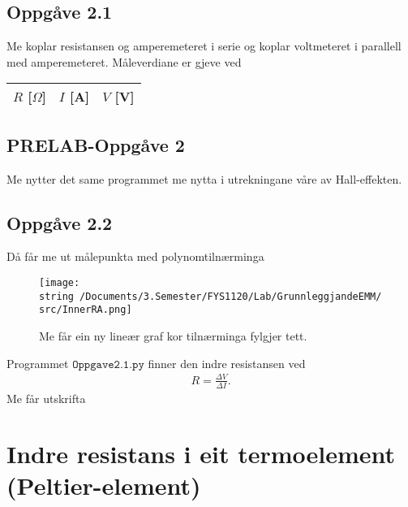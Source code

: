 \documentclass[11pt, a4paper]{article}
\begin{document}
  \subsection*{Oppgåve 2.1}
    Me koplar resistansen og amperemeteret i serie og koplar voltmeteret i parallell med amperemeteret.
    Måleverdiane er gjeve ved
    \begin{center}
      \begin{tabular}{|l||l|l|}
        \hline
        $R$ [$\Omega$] & $I$ [A] & $V$ [V] \\
        \hline
        
        \hline
      \end{tabular}
    \end{center}


  \subsection*{PRELAB-Oppgåve 2}
    Me nytter det same programmet me nytta i utrekningane våre av Hall-effekten.
    

  
  \subsection*{Oppgåve 2.2}
     Då får me ut målepunkta med polynomtilnærminga
    \begin{figure}[H]
      \centering
      \texttt{[image: \\string~/Documents/3.Semester/FYS1120/Lab/GrunnleggjandeEMM/src/InnerRA.png]}
      \caption{Me får ein ny lineær graf kor tilnærminga fylgjer tett.}
    \end{figure}

    Programmet $\texttt{Oppgave2.1.py}$ finner den indre resistansen ved
    \begin{align*}
      R = \frac{\Delta V}{\Delta I}.
    \end{align*}
    Me får utskrifta
    \begin{center}
      
    \end{center}


\newpage


\section*{Indre resistans i eit termoelement (Peltier-element)}
\end{document}
